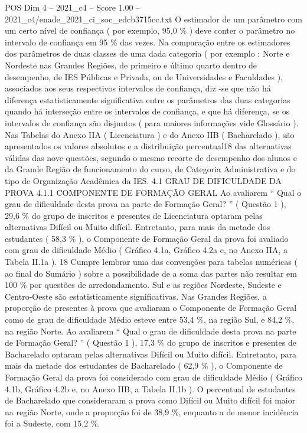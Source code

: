 \begin{textsample}{POS Dim 4 – 2021\_c4 – Score 1.00 – 2021\_c4/enade\_2021\_ci\_soc\_edcb3715cc.txt}
O estimador de um parâmetro com um certo nível de confiança ( por exemplo, 95,0 \% ) deve conter o parâmetro no intervalo de confiança em 95 \% das vezes.
Na comparação entre os estimadores dos parâmetros de duas classes de uma dada categoria ( por exemplo : Norte e Nordeste nas Grandes Regiões, de primeiro e último quarto dentro de desempenho, de IES Públicas e Privada, ou de Universidades e Faculdades ), associados aos seus respectivos intervalos de confiança, diz -se que não há diferença estatisticamente significativa entre os parâmetros das duas categorias quando há interseção entre os intervalos de confiança, e que há diferença, se os intervalos de confiança são disjuntos ( para maiores informações vide Glossário ).
Nas Tabelas do Anexo IIA ( Licenciatura ) e do Anexo IIB ( Bacharelado ), são apresentados os valores absolutos e a distribuição percentual18 das alternativas válidas das nove questões, segundo o mesmo recorte de desempenho dos alunos e da Grande Região de funcionamento do curso, de Categoria Administrativa e do tipo de Organização Acadêmica da IES. 4.1 GRAU DE DIFICULDADE DA PROVA 4.1.1 COMPONENTE DE FORMAÇÃO GERAL Ao avaliarem “ Qual o grau de dificuldade desta prova na parte de Formação Geral? ” ( Questão 1 ), 29,6 \% do grupo de inscritos e presentes de Licenciatura optaram pelas alternativas Difícil ou Muito difícil.
Entretanto, para mais da metade dos estudantes ( 58,3 \% ), o Componente de Formação Geral da prova foi avaliado com grau de dificuldade Médio ( Gráfico 4.1a, Gráfico 4.2a e, no Anexo IIA, a Tabela II.1a ). 18 Cumpre lembrar uma das convenções para tabelas numéricas ( ao final do Sumário ) sobre a possibilidade de a soma das partes não resultar em 100 \% por questões de arredondamento.
Sul e as regiões Nordeste, Sudeste e Centro-Oeste são estatisticamente significativas.
Nas Grandes Regiões, a proporção de presentes à prova que avaliaram o Componente de Formação Geral como de grau de dificuldade Médio esteve entre 53,4 \%, na região Sul, e 84,2 \%, na região Norte.
Ao avaliarem “ Qual o grau de dificuldade desta prova na parte de Formação Geral? ” ( Questão 1 ), 17,3 \% do grupo de inscritos e presentes de Bacharelado optaram pelas alternativas Difícil ou Muito difícil.
Entretanto, para mais da metade dos estudantes de Bacharelado ( 62,9 \% ), o Componente de Formação Geral da prova foi considerado com grau de dificuldade Médio ( Gráfico 4.1b, Gráfico 4.2b e, no Anexo IIB, a Tabela II.1b ).
O percentual de estudantes de Bacharelado que consideraram a prova como Difícil ou Muito difícil foi maior na região Norte, onde a proporção foi de 38,9 \%, enquanto a de menor incidência foi a Sudeste, com 15,2 \%.

\end{textsample}
